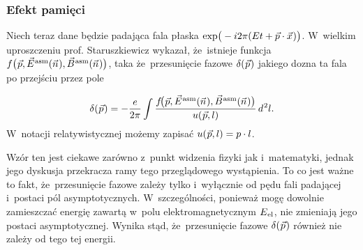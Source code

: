 \documentclass[10pt,t]{beamer}
\begin{document}
\begin{frame}
  \frametitle{Efekt pamięci}


  Niech teraz dane będzie padająca fala płaska
  $\exp\!\big( -i 2\pi ( E t + \vec{p} \cdot \vec{x} \hspace{0.05em} ) \big)$. W~wielkim
  uproszczeniu prof. Staruszkiewicz wykazał, że~istnieje funkcja
  $f\big( \hspace{0.05em} \vec{p}, \vec{E}^{ \hspace{0.05em} \text{asm} }( \vec{n} \hspace{0.05em} ), \vec{B}^{ \hspace{0.05em} \text{asm} }( \vec{n} \hspace{0.05em} ) \big)$, taka
  że~przesunięcie fazowe $\delta( \hspace{0.05em} \vec{p} \hspace{0.05em} )$ jakiego
  dozna ta fala po przejściu przez pole

  \vspace{-1em}


  \begin{equation}
    \label{eq:Pola-asymptotyczne-i-efekt-pamieci-01}
    \delta( \hspace{0.05em} \vec{p} \hspace{0.05em} ) =
    -\frac{ e }{ 2\pi }
    \int \frac{ f\!\big( \hspace{0.05em} \vec{p}, \vec{E}^{ \hspace{0.05em} \text{asm} }( \vec{n} \hspace{0.05em} ),
      \vec{B}^{ \hspace{0.05em} \text{asm} }( \vec{n} \hspace{0.05em} ) \big) }{ u( \hspace{0.05em} \vec{p}, l ) } \,
    d^{ \hspace{0.05em} 2 } l.
  \end{equation}
  W~notacji relatywistycznej możemy zapisać
  $u( \hspace{0.05em} \vec{p}, l ) = p \cdot l$.

  Wzór ten jest ciekawe zarówno z~punkt widzenia fizyki jak i~matematyki,
  jednak jego dyskusja przekracza ramy tego przeglądowego wystąpienia. To co
  jest ważne to fakt, że~przesunięcie fazowe zależy \alert{tylko
    i~wyłącznie} od pędu fali padającej i~postaci pól asymptotycznych.
  W~szczególności, ponieważ mogę dowolnie zamieszczać energię zawartą
  w~polu elektromagnetycznym $E_{ \hspace{0.05em} \text{el} }$, nie zmieniają jego
  postaci asymptotycznej. Wynika stąd, że~przesunięcie fazowe
  $\delta( \hspace{0.05em} \vec{p} \hspace{0.05em} )$ również nie zależy od tego tej
  energii.

\end{frame}
\end{document}
